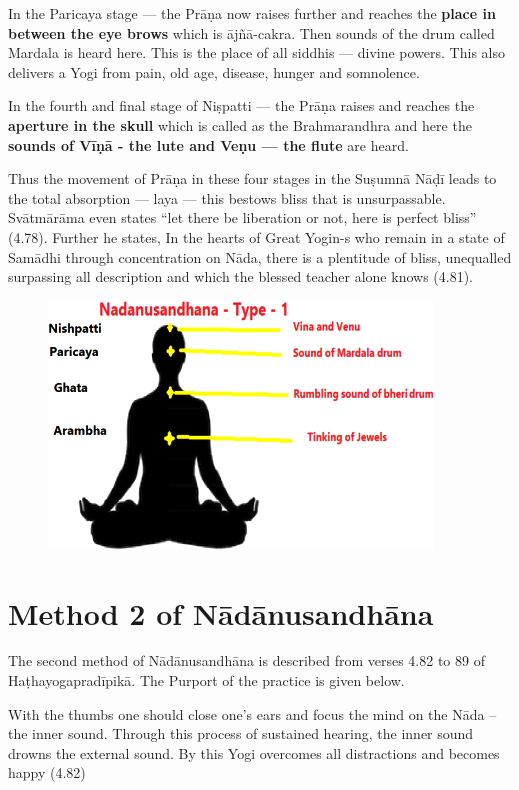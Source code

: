 In the Paricaya stage --- the Prāṇa now raises further and reaches the \textbf{place in between the eye brows} which is ājñā-cakra.  Then sounds of the drum called Mardala is heard here. This is the place of all siddhis --- divine powers. This also delivers a Yogi from pain, old age, disease, hunger and somnolence.
 
In the fourth and final stage of Niṣpatti --- the Prāṇa raises and reaches the \textbf{aperture in the skull} which is called as the Brahmarandhra and here the \textbf{sounds of Vīṇā - the lute and Veṇu --- the flute} are heard. 

Thus the movement of Prāṇa in these four stages in the Suṣumnā Nāḍī leads to the total absorption --- laya --- this bestows bliss that is unsurpassable. Svātmārāma even states “let there be liberation or not, here is perfect bliss” (4.78). Further he states, In the hearts of Great Yogin-s who remain in a state of Samādhi through concentration on Nāda, there is a plentitude of bliss, unequalled surpassing all description and which the blessed teacher alone knows (4.81). 

\begin{figure}
\centering
\includegraphics[scale=.8]{images/fig1.png}
\end{figure}

\section*{Method 2 of Nādānusandhāna}

The second method of Nādānusandhāna is described from verses 4.82 to 89 of Haṭhayogapradīpikā. The Purport of the practice is given below.

With the thumbs one should close one’s ears and focus the mind on the Nāda – the inner sound. Through this process of sustained hearing, the inner sound drowns the external sound. By this Yogi overcomes all distractions and becomes happy (4.82)

